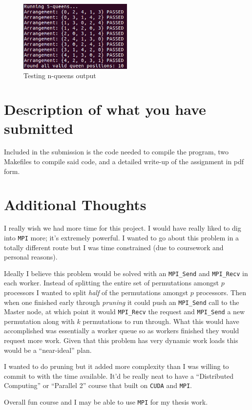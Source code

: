 \documentclass{article}
\begin{document}
\begin{figure}[h]
    \centering
    \includegraphics[width=0.5\textwidth]{console_output}
    \caption{Testing n-queens output}
    \label{fig:console}
\end{figure}

\section{Description of what you have submitted}
Included in the submission is the code needed to compile the program, two 
Makefiles to compile said code, and a detailed write-up of the assignment in pdf 
form.

\section{Additional Thoughts}
I really wish we had more time for this project. I would have really liked to 
dig into \verb|MPI| more; it's extremely powerful. I wanted to go about this 
problem in a totally different route but I was time constrained (due to 
coursework and personal reasons). 

Ideally I believe this problem would be solved with an \verb|MPI_Send| and 
\verb|MPI_Recv| in each worker. Instead of splitting the entire set of 
permutations amongst $p$ processors I wanted to split \textit{half} of the 
permutations amongst $p$ processors. Then when one finished early through 
\textit{pruning} it could push an \verb|MPI_Send| call to the Master node, at 
which point it would \verb|MPI_Recv| the request and \verb|MPI_Send| a new 
permutation along with $k$ permutations to run through. What this would have 
accomplished was essentially a worker queue so as workers finished they would 
request more work. Given that this problem has very dynamic work loads this 
would be a ``near-ideal'' plan.

I wanted to do pruning but it added more complexity than I was willing to commit 
to with the time available. It'd be really neat to have a 
``Distributed Computing'' or ``Parallel 2'' course that built on \verb|CUDA| and 
\verb|MPI|.

Overall fun course and I may be able to use \verb|MPI| for my thesis work.
\end{document}
